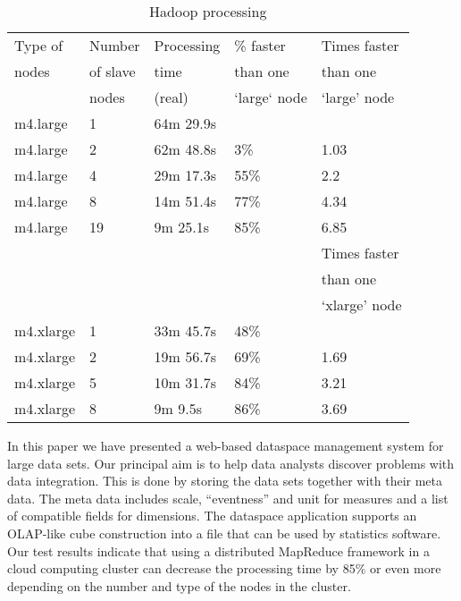 \documentclass[USenglish,twocolumn]{article}
\begin{document}
\begin{table}[]
\begin{tabular}{lllll}
Type of       & Number      & Processing      & \% faster        & Times faster                        \\
nodes         & of slave    & time            & than one         & than one                            \\
              & nodes       & (real)          & ‘large‘ node     & ‘large’ node                        \\
\midrule
m4.large      & 1           & 64m 29.9s       &                  &                                     \\
m4.large      & 2           & 62m 48.8s       & 3\%              & 1.03                                \\
m4.large      & 4           & 29m 17.3s       & 55\%             & 2.2                                 \\
m4.large      & 8           & 14m 51.4s       & 77\%             & 4.34                                \\
m4.large      & 19          & 9m 25.1s        & 85\%             & 6.85                                \\
              &             &                 &                  & Times faster\\
              &             &                 &                  & than one\\
              &             &                 &                  & ‘xlarge’ node \\
m4.xlarge     & 1           & 33m 45.7s       & 48\%             &                                     \\
m4.xlarge     & 2           & 19m 56.7s       & 69\%             & 1.69                                \\
m4.xlarge     & 5           & 10m 31.7s       & 84\%             & 3.21                                \\
m4.xlarge     & 8           & 9m 9.5s         & 86\%             & 3.69                               \\
\end{tabular}
\caption{\label{table2}Hadoop processing}
\end{table}

In this paper we have presented a web-based dataspace management system
for large data sets. Our principal aim is to help data analysts discover
problems with data integration. This is done by storing the data sets
together with their meta data. The meta data includes scale,
``eventness'' and unit for measures and a list of compatible fields for
dimensions. The dataspace application supports an OLAP-like cube
construction into a file that can be used by statistics software. Our
test results indicate that using a distributed MapReduce framework in a
cloud computing cluster can decrease the processing time by 85\% or even
more depending on the number and type of the nodes in the cluster.
\end{document}
